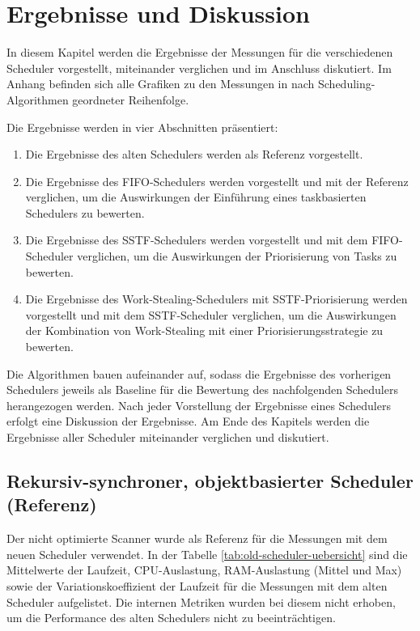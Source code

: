 \chapter{Ergebnisse und Diskussion}
\label{ch:chapter04}
In diesem Kapitel werden die Ergebnisse der Messungen für die verschiedenen Scheduler vorgestellt, 
miteinander verglichen und im Anschluss diskutiert.
Im Anhang befinden sich alle Grafiken zu den Messungen in nach Scheduling-Algorithmen geordneter Reihenfolge.
\begin{sloppypar}

\vspace{7.56mm}
\noindent Die Ergebnisse werden in vier Abschnitten präsentiert:
\begin{enumerate}
    \item Die Ergebnisse des alten Schedulers werden als Referenz vorgestellt.
    \item Die Ergebnisse des \acs{FIFO}-Schedulers werden vorgestellt und mit der Referenz verglichen, 
    um die Auswirkungen der Einführung eines taskbasierten Schedulers zu bewerten.
    \item Die Ergebnisse des \acs{SSTF}-Schedulers werden vorgestellt und mit dem \acs{FIFO}-Scheduler verglichen, um die Auswirkungen der Priorisierung von Tasks zu bewerten.
    \item Die Ergebnisse des Work-Stealing-Schedulers mit \acs{SSTF}-Priorisierung werden vorgestellt und mit dem \acs{SSTF}-Scheduler verglichen, um die Auswirkungen der Kombination von Work-Stealing mit einer Priorisierungsstrategie zu bewerten.
    \end{enumerate}
\vspace{7.56mm}
Die Algorithmen bauen aufeinander auf, sodass die Ergebnisse des vorherigen Schedulers jeweils als Baseline für die Bewertung des nachfolgenden Schedulers herangezogen werden.
Nach jeder Vorstellung der Ergebnisse eines Schedulers erfolgt eine Diskussion der Ergebnisse. Am Ende des Kapitels werden die Ergebnisse aller Scheduler miteinander verglichen und diskutiert. 

\section{Rekursiv-synchroner, objektbasierter Scheduler (Referenz)}

Der nicht optimierte Scanner wurde als Referenz für die Messungen mit dem neuen Scheduler verwendet.
In der Tabelle \ref{tab:old-scheduler-uebersicht} sind die Mittelwerte der Laufzeit, \acs{CPU}-Auslastung, 
\acs{RAM}-Auslastung (Mittel und Max) sowie der Variationskoeffizient der Laufzeit für die Messungen 
mit dem alten Scheduler aufgelistet.
Die internen Metriken wurden bei diesem nicht erhoben, um die Performance des alten Schedulers nicht zu beeinträchtigen.


\end{sloppypar}

